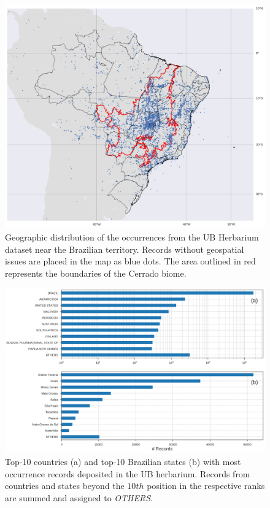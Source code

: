   \begin{figure}[!htb]
  	\centering
    \includegraphics[width=\linewidth]{figures/occurrence_map.png}
    \caption{Geographic distribution of the occurrences from the UB Herbarium dataset near the Brazilian territory. Records without geospatial issues are placed in the map as blue dots. The area outlined in red represents the boundaries of the Cerrado biome.}
    \label{fig:occurrence_map}
  \end{figure}
  
  \begin{figure}[!htb]
  	\centering
    \includegraphics[width=\linewidth]{figures/recs_by_cntry_state.png}
    \caption{Top-10 countries (a) and top-10 Brazilian states (b) with most occurrence records deposited in the UB herbarium. Records from countries and states beyond the $10th$ position in the respective ranks are summed and assigned to \textit{OTHERS}.}
    \label{fig:recs_by_cntry_state}
  \end{figure}
  
